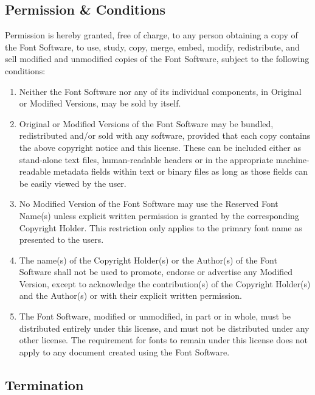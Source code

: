 \documentclass[paper=a4, 10pt]{scrbook}
\begin{document}
\subsection{Permission \& Conditions}

Permission is hereby granted, free of charge, to any person obtaining a copy of the Font Software, to use, study, copy, merge, embed, modify, redistribute, and sell modified and unmodified copies of the Font Software, subject to the following conditions:

\begin{enumerate}
	\item Neither the Font Software nor any of its individual components, in Original or Modified Versions, may be sold by itself.
	\item Original or Modified Versions of the Font Software may be bundled, redistributed and/or sold with any software, provided that each copy contains the above copyright notice and this license. These can be included either as stand-alone text files, human-readable headers or in the appropriate machine-readable metadata fields within text or binary files as long as those fields can be easily viewed by the user.
	\item No Modified Version of the Font Software may use the Reserved Font Name(s) unless explicit written permission is granted by the corresponding Copyright Holder. This restriction only applies to the primary font name as presented to the users.

	\item The name(s) of the Copyright Holder(s) or the Author(s) of the Font Software shall not be used to promote, endorse or advertise any Modified Version, except to acknowledge the contribution(s) of the Copyright Holder(s) and the Author(s) or with their explicit written permission.

	\item The Font Software, modified or unmodified, in part or in whole, must be distributed entirely under this license, and must not be
distributed under any other license. The requirement for fonts to remain under this license does not apply to any document created using the Font Software.

\end{enumerate}

\subsection{Termination}
\end{document}
